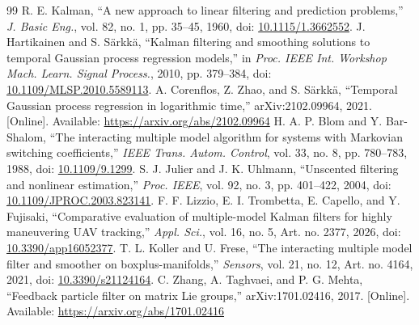 \documentclass[journal]{IEEEtran}
\begin{document}
\begin{thebibliography}{99}
R. E. Kalman, ``A new approach to linear filtering and prediction
problems,'' \emph{J. Basic Eng.}, vol. 82, no. 1, pp. 35--45, 1960,
doi: \href{https://doi.org/10.1115/1.3662552}{10.1115/1.3662552}.
J. Hartikainen and S. S\"arkk\"a, ``Kalman filtering and smoothing
solutions to temporal Gaussian process regression models,'' in
\emph{Proc. IEEE Int. Workshop Mach. Learn. Signal Process.}, 2010,
pp. 379--384, doi: \href{https://doi.org/10.1109/MLSP.2010.5589113}{10.1109/MLSP.2010.5589113}.
A. Corenflos, Z. Zhao, and S. S\"arkk\"a, ``Temporal Gaussian process
regression in logarithmic time,'' arXiv:2102.09964, 2021.
[Online]. Available: \url{https://arxiv.org/abs/2102.09964}
H. A. P. Blom and Y. Bar-Shalom, ``The interacting multiple model
algorithm for systems with Markovian switching coefficients,''
\emph{IEEE Trans. Autom. Control}, vol. 33, no. 8, pp. 780--783, 1988,
doi: \href{https://doi.org/10.1109/9.1299}{10.1109/9.1299}.
S. J. Julier and J. K. Uhlmann, ``Unscented filtering and nonlinear
estimation,'' \emph{Proc. IEEE}, vol. 92, no. 3, pp. 401--422, 2004,
doi: \href{https://doi.org/10.1109/JPROC.2003.823141}{10.1109/JPROC.2003.823141}.
F. F. Lizzio, E. I. Trombetta, E. Capello, and Y. Fujisaki,
``Comparative evaluation of multiple-model Kalman filters for highly
maneuvering UAV tracking,'' \emph{Appl. Sci.}, vol. 16, no. 5,
Art. no. 2377, 2026, doi: \href{https://doi.org/10.3390/app16052377}{10.3390/app16052377}.
T. L. Koller and U. Frese, ``The interacting multiple model filter and
smoother on boxplus-manifolds,'' \emph{Sensors}, vol. 21, no. 12,
Art. no. 4164, 2021, doi: \href{https://doi.org/10.3390/s21124164}{10.3390/s21124164}.
C. Zhang, A. Taghvaei, and P. G. Mehta, ``Feedback particle filter on
matrix Lie groups,'' arXiv:1701.02416, 2017.
[Online]. Available: \url{https://arxiv.org/abs/1701.02416}
\end{thebibliography}
\end{document}
